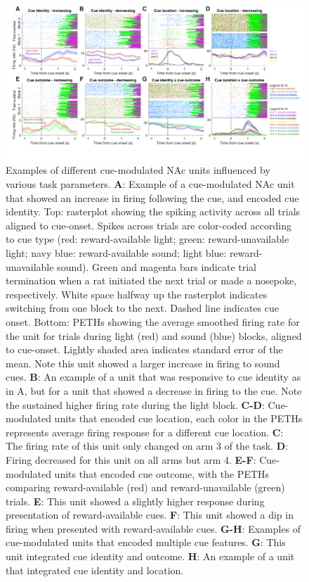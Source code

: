\documentclass[11pt]{article}
\newcommand{\bsf}[1]{\textbf{#1}}
\begin{document}
 \begin{figure}[ht!]
\centering
\includegraphics[width=\textwidth]{Fig 5 - Neural examples.pdf}
\caption{Examples of different cue-modulated NAc units influenced by various
  task parameters. \bsf{A}: Example of a cue-modulated NAc unit that showed an
  increase in firing following the cue, and encoded cue identity. Top:
  rasterplot showing the spiking activity across all trials aligned to
  cue-onset. Spikes across trials are color-coded according to cue type (red:
  reward-available light; green: reward-unavailable light; navy blue:
  reward-available sound; light blue: reward-unavailable sound). Green and
  magenta bars indicate trial termination when a rat initiated the next trial or
  made a nosepoke, respectively. White space halfway up the rasterplot indicates
  switching from one block to the next. Dashed line indicates cue onset. Bottom:
  PETHs showing the average smoothed firing rate for the unit for trials during
  light (red) and sound (blue) blocks, aligned to cue-onset. Lightly shaded area
  indicates standard error of the mean. Note this unit showed a larger increase
  in firing to sound cues. \bsf{B}: An example of a unit that was responsive to
  cue identity as in A, but for a unit that showed a decrease in firing to the
  cue. Note the sustained higher firing rate during the light block. \bsf{C-D}:
  Cue-modulated units that encoded cue location, each color in the PETHs
  represents average firing response for a different cue location. \bsf{C}: The
  firing rate of this unit only changed on arm 3 of the task. \bsf{D}: Firing
  decreased for this unit on all arms but arm 4. \bsf{E-F}: Cue-modulated units
  that encoded cue outcome, with the PETHs comparing reward-available (red) and
  reward-unavailable (green) trials. \bsf{E}: This unit showed a slightly higher
  response during presentation of reward-available cues. \bsf{F}: This unit
  showed a dip in firing when presented with reward-available cues. \bsf{G-H}:
  Examples of cue-modulated units that encoded multiple cue features. \bsf{G}:
  This unit integrated cue identity and outcome. \bsf{H}: An example of a unit
  that integrated cue identity and location.}
\label{fig:examples}
\end{figure} \clearpage
\end{document}
